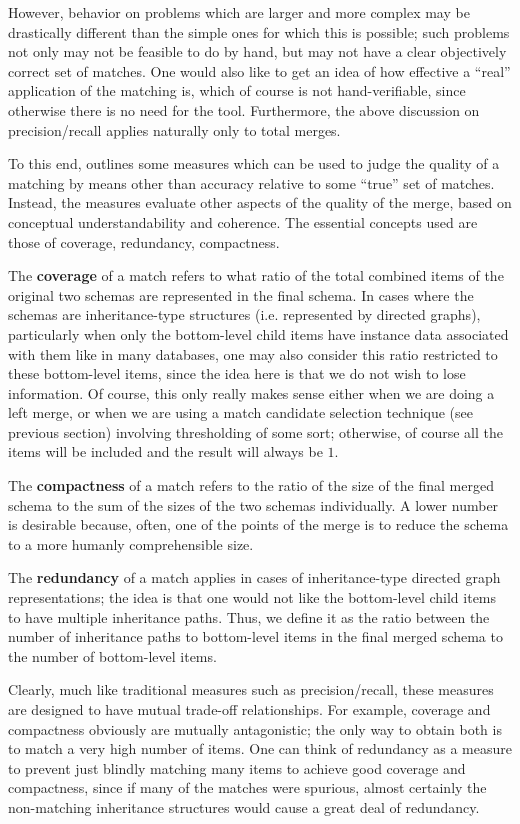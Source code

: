 \documentclass{datamade}
\theoremstyle{definition}
\theoremstyle{remark}
\begin{document}
However, behavior on problems which are larger and more complex may be drastically different than the simple ones for which this is possible; such problems not only may not be feasible to do by hand, but may not have a clear objectively correct set of matches. One would also like to get an idea of how effective a ``real'' application of the matching is, which of course is not hand-verifiable, since otherwise there is no need for the tool. Furthermore, the above discussion on precision/recall applies naturally only to total merges.

To this end, \cite{comabenchmark} outlines some measures which can be used to judge the quality of a matching by means other than accuracy relative to some ``true'' set of matches. Instead, the measures evaluate other aspects of the quality of the merge, based on conceptual understandability and coherence. The essential concepts used are those of coverage, redundancy, compactness.

The \textbf{coverage} of a match refers to what ratio of the total combined items of the original two schemas are represented in the final schema. In cases where the schemas are inheritance-type structures (i.e. represented by directed graphs), particularly when only the bottom-level child items have instance data associated with them like in many databases, one may also consider this ratio restricted to these bottom-level items, since the idea here is that we do not wish to lose information. Of course, this only really makes sense either when we are doing a left merge, or when we are using a match candidate selection technique (see previous section) involving thresholding of some sort; otherwise, of course all the items will be included and the result will always be $1$.

The \textbf{compactness} of a match refers to the ratio of the size of the final merged schema to the sum of the sizes of the two schemas individually. A lower number is desirable because, often, one of the points of the merge is to reduce the schema to a more humanly comprehensible size.

The \textbf{redundancy} of a match applies in cases of inheritance-type directed graph representations; the idea is that one would not like the bottom-level child items to have multiple inheritance paths. Thus, we define it as the ratio between the number of inheritance paths to bottom-level items in the final merged schema to the number of bottom-level items.

Clearly, much like traditional measures such as precision/recall, these measures are designed to have mutual trade-off relationships. For example, coverage and compactness obviously are mutually antagonistic; the only way to obtain both is to match a very high number of items. One can think of redundancy as a measure to prevent just blindly matching many items to achieve good coverage and compactness, since if many of the matches were spurious, almost certainly the non-matching inheritance structures would cause a great deal of redundancy.
\end{document}

